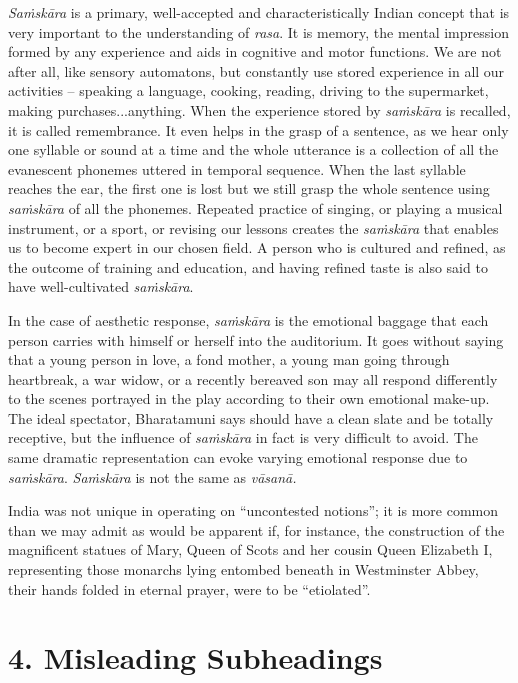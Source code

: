 \textit{Saṁskāra} is a primary, well-accepted and characteristically Indian concept that is very important to the understanding of \textit{rasa}. It is memory, the mental impression formed by any experience and aids in cognitive and motor functions. We are not after all, like sensory automatons, but constantly use stored experience in all our activities – speaking a language, cooking, reading, driving to the supermarket, making purchases...anything. When the experience stored by \textit{saṁskāra} is recalled, it is called remembrance. It even helps in the grasp of a sentence, as we hear only one syllable or sound at a time and the whole utterance is a collection of all the evanescent phonemes uttered in temporal sequence. When the last syllable reaches the ear, the first one is lost but we still grasp the whole sentence using \textit{saṁskāra} of all the phonemes. Repeated practice of singing, or playing a musical instrument, or a sport, or revising our lessons creates the \textit{saṁskāra} that enables us to become expert in our chosen field. A person who is cultured and refined, as the outcome of training and education, and having refined taste is also said to have well-cultivated \textit{saṁskāra}.

In the case of aesthetic response, \textit{saṁskāra} is the emotional baggage that each person carries with himself or herself into the auditorium. It goes without saying that a young person in love, a fond mother, a young man going through heartbreak, a war widow, or a recently bereaved son may all respond differently to the scenes portrayed in the play according to their own emotional make-up. The ideal spectator, Bharatamuni says should have a clean slate and be totally receptive, but the influence of \textit{saṁskāra} in fact is very difficult to avoid. The same dramatic representation can evoke varying emotional response due to \textit{saṁskāra}. \textit{Saṁskāra} is not the same as \textit{vāsanā.}

India was not unique in operating on “uncontested notions”; it is more common than we may admit as would be apparent if, for instance, the construction of the magnificent statues of Mary, Queen of Scots and her cousin Queen Elizabeth I, representing those monarchs lying entombed beneath in Westminster Abbey, their hands folded in eternal prayer, were to be “etiolated”.


\section*{4. Misleading Subheadings}


